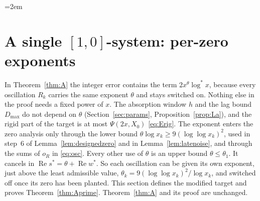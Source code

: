 \begingroup\emergencystretch=2em
\section{A single \texorpdfstring{$[1,0]$}{[1,0]}-system: per-zero exponents}\label{sec:onezero}

In Theorem~\ref{thm:A} the integer error contains the term $2x^{\theta}\log^*x$, because every oscillation $R_k$ carries the same
exponent $\theta$ and stays switched on. Nothing else in the proof needs a fixed power of $x$. The absorption window $h$ and the lag
bound $D_{\max}$ do not depend on $\theta$ (Section~\ref{sec:params}, Proposition~\ref{prop:La}), and the rigid part of the target is
at most $\Psi(2x,X_0)$ \eqref{eq:Erig}. The exponent enters the zero analysis only through the lower bound
$\theta\log x_k\ge9(\log\log x_k)^2$, used in step~6 of Lemma~\ref{lem:designedzero} and in Lemma~\ref{lem:latenoise}, and through
the sums of $o_R$ in \eqref{eq:osc}. Every other use of $\theta$ is an upper bound $\theta\le\theta_1$. It cancels in
$\operatorname{Re}s^*=\theta+\operatorname{Re}w^*$. So each oscillation can be given its own exponent, just above the least admissible value,
$\theta_k=9(\log\log x_k)^2/\log x_k$, and switched off once its zero has been planted. This section defines the modified target and
proves Theorem~\ref{thm:Aprime}. Theorem~\ref{thm:A} and its proof are unchanged.

